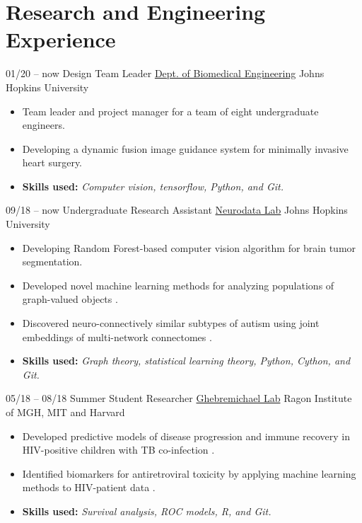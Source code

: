 \section{Research and Engineering Experience}
\cventry
{01/20 -- now}
{Design Team Leader}
{\href{https://cbid.bme.jhu.edu/academics/undergraduate-studies/}{Dept. of Biomedical Engineering}}
{Johns Hopkins University}
{}
{
\begin{itemize}
    \item Team leader and project manager for a team of eight undergraduate engineers.
    \item Developing a dynamic fusion image guidance system for minimally invasive heart surgery.
    \item \textbf{Skills used:} \textit{Computer vision, tensorflow, Python, and Git.}
\end{itemize}{}
}

\cventry
{09/18 -- now}
{Undergraduate Research Assistant}
{\href{https://neurodata.io}{Neurodata Lab}}
{Johns Hopkins University}
{}
{
\begin{itemize}
    \item Developing Random Forest-based computer vision algorithm for brain tumor segmentation.
    \item Developed novel machine learning methods for analyzing populations of graph-valued objects \cite{gopalakrishnanMultiscaleComparativeConnectomics2020, chungStatisticalConnectomics2020b}.
    \item Discovered neuro-connectively similar subtypes of autism using joint embeddings of multi-network connectomes \cite{wangVariabilityHeritabilityMouse2020, gopalakrishnanBMES2019}.
    \item \textbf{Skills used:} \textit{Graph theory, statistical learning theory, Python, Cython, and Git.}
\end{itemize}
}

\cventry
{05/18 -- 08/18}
{Summer Student Researcher}
{\href{http://www.ragoninstitute.org/portfolio-item/ghebremichael/}{Ghebremichael Lab}}
{Ragon Institute of MGH, MIT and Harvard}
{}
{
\begin{itemize}
    \item Developed predictive models of disease progression and immune recovery in HIV-positive children with TB co-infection \cite{gopalakrishnanPreHAARTCD4Tlymphocytes2020}.
    \item Identified biomarkers for antiretroviral toxicity by applying machine learning methods to HIV-patient data \cite{leeComparisonMachineLearning2019a}.
    \item \textbf{Skills used:} \textit{Survival analysis, ROC models, R, and Git.}
\end{itemize}{}
}

